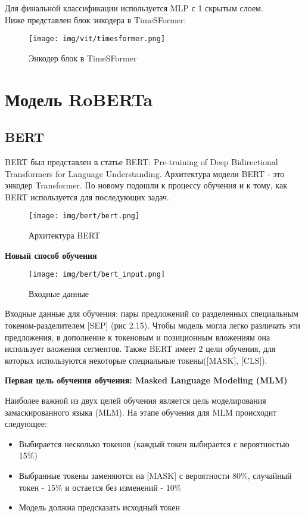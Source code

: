 \documentclass[PMI,VKR]{HSEUniversity}
\begin{document}
Для финальной классификации используется MLP с 1 скрытым слоем. \\

Ниже представлен блок энкодера в TimeSFormer:

\begin{figure}[h]
    \centering
    \texttt{[image: img/vit/timesformer.png]}
    \caption{Энкодер блок в TimeSFormer}
\end{figure}

\newpage
\section{Модель RoBERTa}

\subsection{BERT}

BERT был представлен в статье BERT: Pre-training of Deep Bidirectional Transformers for Language Understanding\cite{bert:2018}. Архитектура модели BERT - это энкодер Transformer. По новому подошли к процессу обучения и к тому, как BERT используется для последующих задач.

\begin{figure}[h]
    \centering
    \texttt{[image: img/bert/bert.png]}
    \caption{Архитектура BERT}
\end{figure}

\begin{center}
\textbf{Новый способ обучения}    
\end{center}

\begin{figure}[h]
    \centering
    \texttt{[image: img/bert/bert\_input.png]}
    \caption{Входные данные}
\end{figure}

Входные данные для обучения: пары предложений со  разделенных специальным токеном-разделителем [SEP] (рис 2.15). Чтобы модель могла легко различать эти предложения, в дополнение к токеновым и позиционным вложениям она использует вложения сегментов. Также BERT имеет 2 цели обучения, для которых используются некоторые специальные токены([MASK], [CLS]). \\

\begin{center}
\textbf{Первая цель обучения обучения: Masked Language Modeling (MLM)}    
\end{center}
 Наиболее важной из двух целей обучения является цель моделирования замаскированного языка (MLM). На этапе обучения для MLM происходит следующее:
 \begin{itemize}
     \item Выбирается несколько токенов (каждый токен выбирается с вероятностью 15\%)
     \item Выбранные токены заменяются на [MASK] с вероятности 80\%, случайный токен - 15\% и остается без изменений - 10\%
     \item Модель должна предсказать исходный токен
\end{itemize}
\end{document}
